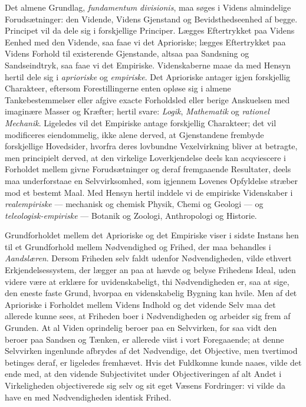 \documentclass[12pt]{book}
\newcommand{\apage}[1]{\marginnote{\footnotesize\textit{[#1]}}}
\begin{document}
Det almene Grundlag, \emph{fundamentum divisionis}, maa søges i Videns
almindelige Forudsætninger: den Vidende, Videns Gjenstand og
Bevidsthedseenhed af begge. Principet vil da dele sig i forskjellige
Principer. Lægges Eftertrykket paa Videns Eenhed med den Vidende, saa faae
vi det Aprioriske; lægges Eftertrykket paa Videns Forhold til existerende
Gjenstande, altsaa paa Sandsning og Sandseindtryk, saa faae vi det
Empiriske. Videnskaberne maae da med Hensyn hertil dele sig i \emph{aprioriske} og
\emph{empiriske}. Det Aprioriske antager igjen forskjellig Charakteer, eftersom
Forestillingerne enten opløse sig i almene Tankebestemmelser eller afgive
exacte Forholdsled eller berige Anskuelsen med imaginære Masser og Kræfter;
hertil svare: \emph{Logik}, \emph{Mathematik} og \emph{rationel Mechanik}. Ligeledes vil det
Empiriske antage forskjellig Charakteer; det vil modificeres eiendommelig,
ikke alene derved, at Gjenstandene frembyde forskjellige Hovedsider,
hvorfra deres lovbundne Vexelvirkning bliver at betragte, men principielt
derved, at den virkelige Loverkjendelse deels kan acqviescere i Forholdet
mellem givne Forudsætninger og deraf fremgaaende Resultater, deels maa
underforstaae en Selvvirksomhed, som igjennem Lovenes Opfyldelse stræber
mod et bestemt Maal. Med Hensyn hertil inddele vi de empiriske \apage{95} Videnskaber
i \emph{realempiriske} --- mechanisk og chemisk Physik, Chemi og Geologi --- og
\emph{teleologisk-empiriske} --- Botanik og Zoologi, Anthropologi og Historie.

Grundforholdet mellem det Aprioriske og det Empiriske viser i sidste
Instans hen til et Grundforhold mellem Nødvendighed og Frihed, der maa
behandles i \emph{Aandslæren}. Dersom Friheden selv faldt udenfor Nødvendigheden,
vilde ethvert Erkjendelsessystem, der lægger an paa at hævde og belyse
Frihedens Ideal, uden videre være at erklære for uvidenskabeligt, thi
Nødvendigheden er, saa at sige, den eneste faste Grund, hvorpaa en
videnskabelig Bygning kan hvile. Men af det Aprioriske i Forholdet mellem
Videns Indhold og det vidende Selv maa det allerede kunne sees, at Friheden
boer i Nødvendigheden og arbeider sig frem af Grunden. At al Viden
oprindelig beroer paa en Selvvirken, for saa vidt den beroer paa Sandsen og
Tænken, er allerede viist i vort Foregaaende; at denne Selvvirken
ingenlunde afbrydes af det Nødvendige, det Objective, men tvertimod
betinges deraf, er ligeledes fremhævet. Hvis det Fuldkomne kunde naaes,
vilde det ende med, at den vidende Subjectivitet under Objectiveringen af
alt Andet i Virkeligheden objectiverede sig selv og sit eget Væsens
Fordringer: vi vilde da have en med Nødvendigheden identisk Frihed.
\end{document}
